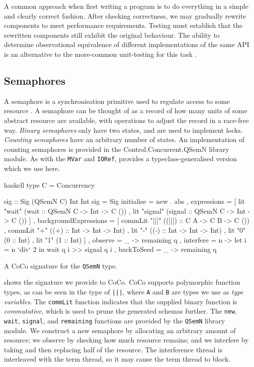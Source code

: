 A common approach when first writing a program is to do everything in
a simple and clearly correct fashion.  After checking correctness, we
may gradually rewrite components to meet performance requirements.
Testing must establish that the rewritten components still exhibit the
original behaviour.  The ability to determine observational
equivalence of different implementations of the same API is an
alternative to the more-common unit-testing for this
task \parencite{he1986}.

\subsection{Semaphores}
\label{sec:coco-cases-semaphore}

A semaphore is a synchronisation primitive used to regulate access to
some resource \parencite{ewd123}.  A semaphore can be thought of as a record
of how many units of some abstract resource are available, with
operations to adjust the record in a race-free way.  \emph{Binary
  semaphores} only have two states, and are used to implement
locks. \emph{Counting semaphores} have an arbitrary number of states.
An implementation of counting semaphores is provided in the
Control.Concurrent.QSemN library module.  As with the \verb|MVar| and
\verb|IORef|, \dejafu{} provides a typeclass-generalised version which
we use here.

\begin{listing}
\centering
\begin{cminted}{haskell}
type C = Concurrency

sig :: Sig (QSemN C) Int Int
sig = Sig
  { initialise = new . abs
  , expressions =
    [ lit "wait"   (wait   :: QSemN C -> Int -> C ())
    , lit "signal" (signal :: QSemN C -> Int -> C ())
    ]
  , backgroundExpressions =
    [ commLit "|||" ((|||) :: C A -> C B -> C ())
    , commLit "+"   ((+)   :: Int -> Int -> Int)
    , lit "-"       ((-)   :: Int -> Int -> Int)
    , lit "0" (0 :: Int)
    , lit "1" (1 :: Int)
    ]
  , observe    = \q _ -> remaining q
  , interfere  = \q n -> let i = n `div` 2 in wait q i >> signal q i
  , backToSeed = \q _ -> remaining q
  }
\end{cminted}
\caption{A CoCo signature for the \texttt{QSemN} type.}
\label{lst:sig}
\end{listing}

 shows the signature we provide to CoCo.  CoCo supports
polymorphic function types, as can be seen in the type of \verb#|||#,
where \verb|A| and \verb|B| are types we use as \emph{type variables}.
The \verb|commLit| function indicates that the supplied binary
function is \emph{commutative}, which is used to prune the generated
schemas further.  The \verb|new|, \verb|wait|, \verb|signal|, and
\verb|remaining| functions are provided by the \verb|QSemN| library
module.  We construct a new semaphore by allocating an arbitrary
amount of resource; we observe by checking how much resource remains;
and we interfere by taking and then replacing half of the resource.
The interference thread is interleaved with the term thread, so it may
cause the term thread to block.

